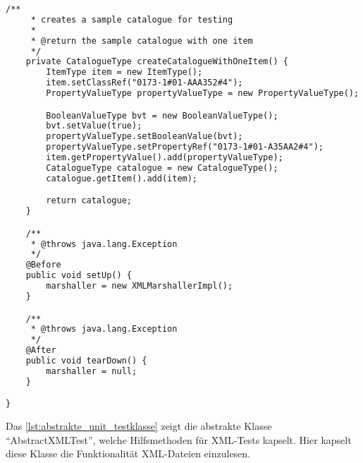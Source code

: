 \begin{lstlisting}[caption=Beispiel eines Unit Tests, language=XML, label=lst:unittest_beispiel]
    /**
     * creates a sample catalogue for testing
     * 
     * @return the sample catalogue with one item
     */
    private CatalogueType createCatalogueWithOneItem() {
        ItemType item = new ItemType();
        item.setClassRef("0173-1#01-AAA352#4");
        PropertyValueType propertyValueType = new PropertyValueType();

        BooleanValueType bvt = new BooleanValueType();
        bvt.setValue(true);
        propertyValueType.setBooleanValue(bvt);
        propertyValueType.setPropertyRef("0173-1#01-A35AA2#4");
        item.getPropertyValue().add(propertyValueType);
        CatalogueType catalogue = new CatalogueType();
        catalogue.getItem().add(item);

        return catalogue;
    }

    /**
     * @throws java.lang.Exception
     */
    @Before
    public void setUp() {
        marshaller = new XMLMarshallerImpl();
    }

    /**
     * @throws java.lang.Exception
     */
    @After
    public void tearDown() {
        marshaller = null;
    }

}
\end{lstlisting}  

Das \autoref{lst:abstrakte_unit_testklasse} zeigt die abstrakte Klasse \enquote{AbstractXMLTest}, welche Hilfsmethoden für XML-Tests kapselt. Hier kapselt diese Klasse die Funktionalität XML-Dateien einzulesen.  

